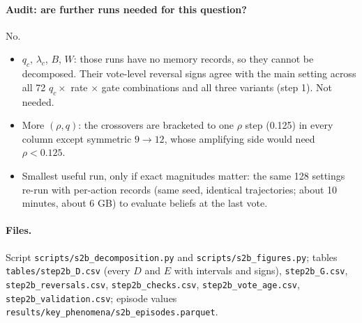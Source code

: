 \documentclass[10pt,a4paper]{article}
\begin{document}
\paragraph{Audit: are further runs needed for this question?} No.
\begin{itemize}\itemsep1pt
\item $q_c$, $\lambda_c$, $B$, $W$: those runs have no memory records, so they cannot be decomposed. Their vote-level
  reversal signs agree with the main setting across all 72 $q_c \times$ rate $\times$ gate combinations and all three
  variants (step 1). Not needed.
\item More $(\rho, q)$: the crossovers are bracketed to one $\rho$ step (0.125) in every column except symmetric
  $9\!\to\!12$, whose amplifying side would need $\rho < 0.125$.
\item Smallest useful run, only if exact magnitudes matter: the same 128 settings re-run with per-action records
  (same seed, identical trajectories; about 10 minutes, about 6 GB) to evaluate beliefs at the last vote.
\end{itemize}

\paragraph{Files.} Script \texttt{scripts/s2b\_decomposition.py} and \texttt{scripts/s2b\_figures.py}; tables
\texttt{tables/step2b\_D.csv} (every $D$ and $E$ with intervals and signs), \texttt{step2b\_G.csv},
\texttt{step2b\_reversals.csv}, \texttt{step2b\_checks.csv}, \texttt{step2b\_vote\_age.csv},
\texttt{step2b\_validation.csv}; episode values \texttt{results/key\_phenomena/s2b\_episodes.parquet}.
\end{document}
